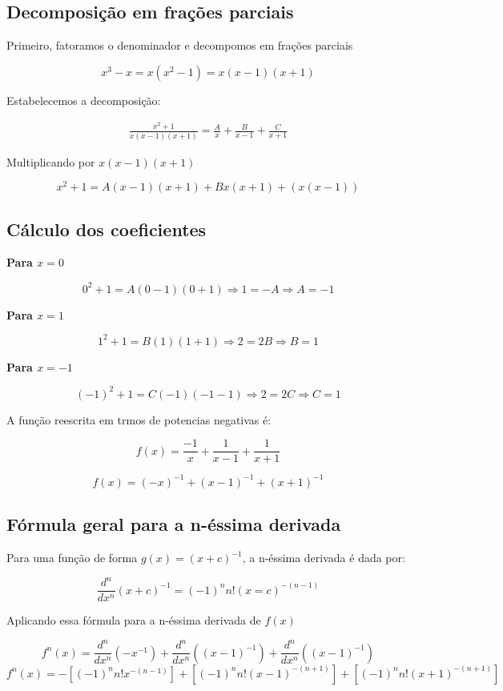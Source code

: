 \documentclass[../resumo.tex]{subfiles}
\begin{document}
	\subsection{Decomposição em frações parciais}

	Primeiro, fatoramos o denominador e decompomos em frações parciais

	\[ x^3 - x = x(x^2 - 1) = x(x - 1)(x + 1) \]

	Estabelecemos a decomposição:

	\begin{align*}
		\frac{x^2 + 1}{x(x-1)(x+1)} = \frac{A}{x} + \frac{B}{x - 1} + \frac{C}{x + 1}
	\end{align*}

	Multiplicando por $x(x-1)(x+1)$

	\[ x^2 + 1 = A(x-1)(x+1) + Bx(x+1) + ( x(x-1) ) \]

	\subsection{Cálculo dos coeficientes}

	\textbf{Para $x = 0$}

	\[ 0^2 + 1 = A(0 - 1)(0 + 1) \Rightarrow 1 = -A \Rightarrow A = -1\]

	\textbf{Para $x = 1$}

	\[ 1^2 + 1 = B(1)(1 + 1) \Rightarrow 2 = 2B \Rightarrow B = 1\]

	\textbf{Para $x = -1$}

	\[ (-1)^2 + 1 = C(-1)(-1 -1) \Rightarrow 2 = 2C \Rightarrow C = 1\]

	A função reescrita em trmos de potencias negativas é:

	\[ f(x) = \frac{-1}{x} + \frac{1}{x-1} + \frac{1}{x+1} \]

	\[ f(x) = (-x)^{-1} + (x - 1)^{-1} + (x + 1)^{-1} \]

	\subsection{Fórmula geral para a n-éssima derivada}

	Para uma função de forma $g(x) = (x + c)^{-1}$, a n-éssima derivada é dada por:

	\[ \frac{d^n}{dx^n} (x + c)^{-1} = (-1)^n n!(x = c)^{-(n-1)} \]

	Aplicando essa fórmula para a n-éssima derivada de $f(x)$

	\[ f^n(x) = \frac{d^n}{dx^n}(-x^{-1}) + \frac{d^n}{dx^n}((x-1)^{-1}) + \frac{d^n}{dx^n}((x-1)^{-1}) \]
	\[ f^n(x) = -[(-1)^n n!x^{-(n-1)}] + [(-1)^n n!(x-1)^{-(n+1)}] + [(-1)^n n! (x+1)^{-(n+1)}] \]
\end{document}
